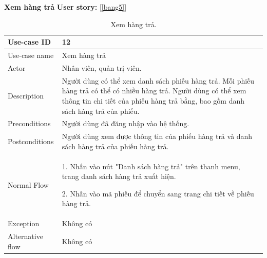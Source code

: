 \textbf{Xem hàng trả}
\textbf{User story:} [\ref{bang5}]
\begin{table}[!htp]
    \centering
    \begin{tabular}{|m{3cm}|m{10cm}|}
    \hline 
        Use-case ID & 12\\ \hline
        Use-case name & Xem hàng trả\\ \hline
        Actor & Nhân viên, quản trị viên.\\ \hline
        Description & Người dùng có thể xem danh sách phiếu hàng trả. Mỗi phiếu hàng trả có thể có nhiều hàng trả. Người dùng có thể xem thông tin chi tiết của phiếu hàng trả bằng, bao gồm danh sách hàng trả của phiếu.\\ \hline
        Preconditions & Người dùng đã đăng nhập vào hệ thống.\\ \hline
        Postconditions & Người dùng xem được thông tin của phiếu hàng trả và danh sách hàng trả của phiếu hàng trả.\\ \hline
        Normal Flow & 
        1. Nhấn vào nút "Danh sách hàng trả" trên thanh menu, trang danh sách hàng trả xuất hiện.\par
        2. Nhấn vào mã phiếu để chuyển sang trang chi tiết về phiếu hàng trả.
        \\ \hline
        Exception & Không có\\ \hline
        Alternative flow & Không có\\ 
    \hline 
    \end{tabular}
    \caption{Xem hàng trả.}
    \label{bang12}
\end{table}

